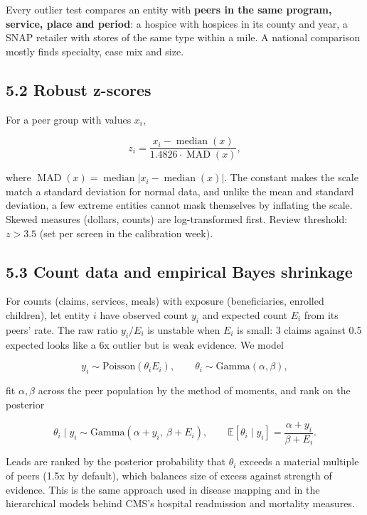 \documentclass[letterpaper,11pt]{article}
\begin{document}
Every outlier test compares an entity with \textbf{peers in the same
program, service, place and period}: a hospice with hospices in its
county and year, a SNAP retailer with stores of the same type within a
mile. A national comparison mostly finds specialty, case mix and size.

\hypertarget{robust-z-scores}{%
\subsection*{5.2 Robust z-scores}\label{robust-z-scores}}

For a peer group with values \(x_i\),

\[z_i = \frac{x_i - \operatorname{median}(x)}{1.4826 \cdot \operatorname{MAD}(x)},\]

where
\(\operatorname{MAD}(x) = \operatorname{median}|x_i - \operatorname{median}(x)|\).
The constant makes the scale match a standard deviation for normal data,
and unlike the mean and standard deviation, a few extreme entities
cannot mask themselves by inflating the scale. Skewed measures (dollars,
counts) are log-transformed first. Review threshold: \(z > 3.5\) (set
per screen in the calibration week).

\hypertarget{count-data-and-empirical-bayes-shrinkage}{%
\subsection*{5.3 Count data and empirical Bayes
shrinkage}\label{count-data-and-empirical-bayes-shrinkage}}

For counts (claims, services, meals) with exposure (beneficiaries,
enrolled children), let entity \(i\) have observed count \(y_i\) and
expected count \(E_i\) from its peers' rate. The raw ratio \(y_i / E_i\)
is unstable when \(E_i\) is small: 3 claims against 0.5 expected looks
like a 6x outlier but is weak evidence. We model

\[y_i \sim \text{Poisson}(\theta_i E_i), \qquad \theta_i \sim \text{Gamma}(\alpha, \beta),\]

fit \(\alpha, \beta\) across the peer population by the method of
moments, and rank on the posterior

\[\theta_i \mid y_i \sim \text{Gamma}(\alpha + y_i,\ \beta + E_i), \qquad
\mathbb{E}[\theta_i \mid y_i] = \frac{\alpha + y_i}{\beta + E_i}.\]

Leads are ranked by the posterior probability that \(\theta_i\) exceeds
a material multiple of peers (1.5x by default), which balances size of
excess against strength of evidence. This is the same approach used in
disease mapping and in the hierarchical models behind CMS's hospital
readmission and mortality measures.
\end{document}
